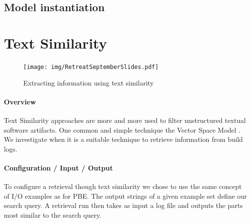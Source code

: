 \documentclass[\myrootdir/main.tex]{subfiles}
\begin{document}
\subsection*{Model instantiation}


\section{Text Similarity}
\begin{figure}[h]
  \centering
\texttt{[image: img/RetreatSeptemberSlides.pdf]}
  \caption{Extracting information using text similarity}
  \label{fig:text-similarity-explanation}
\end{figure}
\paragraph{Overview}
Text Similarity approaches are more and more used to filter unstructured textual software artifacts. 
One common and simple technique the Vector Space Model .
We investigate when it is a suitable technique to retrieve information from build logs.

\paragraph{Configuration / Input / Output}
To configure a retrieval though text similarity we chose to use the same concept of I/O examples as for PBE.
The output strings of a given example set define our search query.
A retrieval run then takes as input a log file and outputs the parts most similar to the search query.
\end{document}
